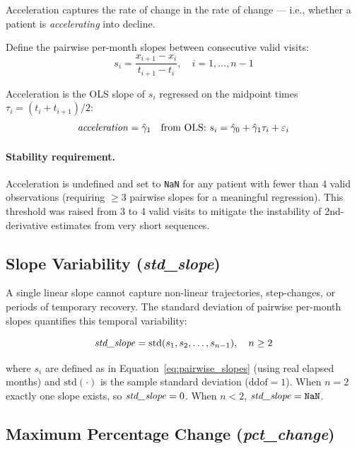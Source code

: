 \documentclass[11pt]{article}
\begin{document}
Acceleration captures the rate of change in the rate of change --- i.e., whether a patient is \emph{accelerating} into decline.

Define the pairwise per-month slopes between consecutive valid visits:
\begin{equation}
s_i = \frac{x_{i+1} - x_i}{t_{i+1} - t_i}, \quad i = 1, \ldots, n-1
\label{eq:pairwise_slopes}
\end{equation}

Acceleration is the OLS slope of $s_i$ regressed on the midpoint times $\tau_i = (t_i + t_{i+1})/2$:
\begin{equation}
\text{\textit{acceleration}} = \hat{\gamma}_1 \quad \text{from OLS: } s_i = \hat{\gamma}_0 + \hat{\gamma}_1 \tau_i + \varepsilon_i
\label{eq:acceleration}
\end{equation}

\paragraph{Stability requirement.}  Acceleration is undefined and set to \texttt{NaN} for any patient with fewer than 4 valid observations (requiring $\geq 3$ pairwise slopes for a meaningful regression).  This threshold was raised from 3 to 4 valid visits to mitigate the instability of 2nd-derivative estimates from very short sequences.

\subsection{Slope Variability (\textit{std\_slope})}
\label{subsec:std_slope}

A single linear slope cannot capture non-linear trajectories, step-changes, or periods of temporary recovery.  The standard deviation of pairwise per-month slopes quantifies this temporal variability:

\begin{equation}
\text{\textit{std\_slope}} = \text{std}(s_1, s_2, \ldots, s_{n-1}), \quad n \geq 2
\label{eq:std_slope}
\end{equation}

where $s_i$ are defined as in Equation~\eqref{eq:pairwise_slopes} (using real elapsed months) and $\text{std}(\cdot)$ is the sample standard deviation ($\text{ddof}=1$).  When $n = 2$ exactly one slope exists, so $\text{\textit{std\_slope}} = 0$.  When $n < 2$, $\text{\textit{std\_slope}} = \texttt{NaN}$.

\subsection{Maximum Percentage Change (\textit{pct\_change})}
\label{subsec:pct_change}
\end{document}
